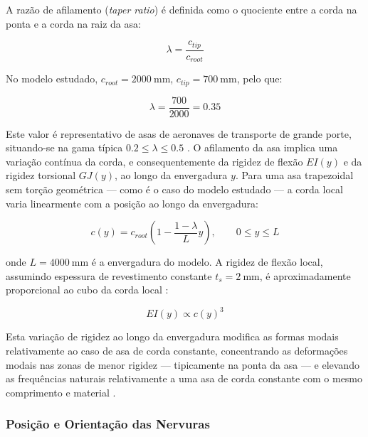 \documentclass[a4paper,fleqn,noprintline]{cas-dc}
\begin{document}
A razão de afilamento (\textit{taper ratio}) é definida como o quociente entre a corda na ponta e a corda na raiz da asa:

\begin{equation}
    \lambda = \frac{c_{tip}}{c_{root}}
    \label{eq:taper_ratio}
\end{equation}

No modelo estudado, $c_{root} = \SI{2000}{\milli\meter}$, 
$c_{tip} = \SI{700}{\milli\meter}$, pelo que:

\begin{equation}
    \lambda = \frac{700}{2000} = 0.35
    \label{eq:taper_ratio_an124}
\end{equation}

Este valor é representativo de asas de aeronaves de transporte de grande porte, situando-se na gama típica $0.2 \leq \lambda \leq 0.5$ \cite{Raymer2018}. O afilamento da asa implica uma variação contínua da corda, e consequentemente da rigidez de flexão $EI(y)$ e da rigidez torsional $GJ(y)$, ao longo da envergadura $y$. Para uma asa trapezoidal sem torção geométrica --- como é o caso do modelo estudado --- a corda local varia linearmente com a posição ao longo da envergadura:

\begin{equation}
    c(y) = c_{root}\left(1 - \frac{1-\lambda}{L}y\right), 
    \qquad 0 \leq y \leq L
    \label{eq:corda_local}
\end{equation}

\noindent onde $L = \SI{4000}{\milli\meter}$ é a envergadura do modelo. A rigidez de flexão local, assumindo espessura de revestimento constante $t_s = \SI{2}{\milli\meter}$, é aproximadamente proporcional ao cubo da corda local \cite{Megson2012}:

\begin{equation}
    EI(y) \propto c(y)^3
    \label{eq:EI_local}
\end{equation}

Esta variação de rigidez ao longo da envergadura modifica as formas modais relativamente ao caso de asa de corda constante, concentrando as deformações modais nas zonas de menor rigidez --- tipicamente na ponta da asa --- e elevando as frequências naturais relativamente a uma asa de corda constante com o mesmo comprimento e material \cite{Rao2011}.

\subsubsection{Posição e Orientação das Nervuras}
\end{document}
